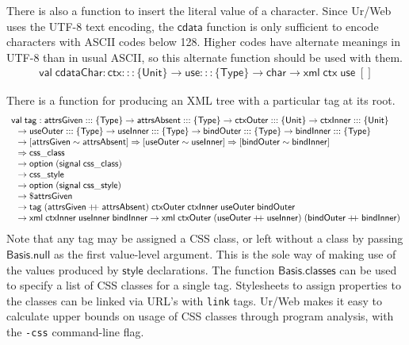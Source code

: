 \documentclass{article}
\newcommand{\cd}[1]{\texttt{#1}}
\newcommand{\mt}[1]{\mathsf{#1}}
\newcommand{\rc}{+ \hspace{-.075in} + \;}
\begin{document}
There is also a function to insert the literal value of a character.  Since Ur/Web uses the UTF-8 text encoding, the $\mt{cdata}$ function is only sufficient to encode characters with ASCII codes below 128.  Higher codes have alternate meanings in UTF-8 than in usual ASCII, so this alternate function should be used with them.
$$\begin{array}{l}
  \mt{val} \; \mt{cdataChar} : \mt{ctx} ::: \{\mt{Unit}\} \to \mt{use} ::: \{\mt{Type}\} \to \mt{char} \to \mt{xml} \; \mt{ctx} \; \mt{use} \; []
\end{array}$$

There is a function for producing an XML tree with a particular tag at its root.
$$\begin{array}{l}
  \mt{val} \; \mt{tag} : \mt{attrsGiven} ::: \{\mt{Type}\} \to \mt{attrsAbsent} ::: \{\mt{Type}\} \to \mt{ctxOuter} ::: \{\mt{Unit}\} \to \mt{ctxInner} ::: \{\mt{Unit}\} \\
  \hspace{.1in} \to \mt{useOuter} ::: \{\mt{Type}\} \to \mt{useInner} ::: \{\mt{Type}\} \to \mt{bindOuter} ::: \{\mt{Type}\} \to \mt{bindInner} ::: \{\mt{Type}\} \\
  \hspace{.1in} \to [\mt{attrsGiven} \sim \mt{attrsAbsent}] \Rightarrow [\mt{useOuter} \sim \mt{useInner}] \Rightarrow [\mt{bindOuter} \sim \mt{bindInner}] \\
  \hspace{.1in} \Rightarrow \mt{css\_class} \\
  \hspace{.1in} \to \mt{option} \; (\mt{signal} \; \mt{css\_class}) \\
  \hspace{.1in} \to \mt{css\_style} \\
  \hspace{.1in} \to \mt{option} \; (\mt{signal} \; \mt{css\_style}) \\
  \hspace{.1in} \to \$\mt{attrsGiven} \\
  \hspace{.1in} \to \mt{tag} \; (\mt{attrsGiven} \rc \mt{attrsAbsent}) \; \mt{ctxOuter} \; \mt{ctxInner} \; \mt{useOuter} \; \mt{bindOuter} \\
  \hspace{.1in} \to \mt{xml} \; \mt{ctxInner} \; \mt{useInner} \; \mt{bindInner} \to \mt{xml} \; \mt{ctxOuter} \; (\mt{useOuter} \rc \mt{useInner}) \; (\mt{bindOuter} \rc \mt{bindInner})
\end{array}$$
Note that any tag may be assigned a CSS class, or left without a class by passing $\mt{Basis.null}$ as the first value-level argument.  This is the sole way of making use of the values produced by $\mt{style}$ declarations.  The function $\mt{Basis.classes}$ can be used to specify a list of CSS classes for a single tag.  Stylesheets to assign properties to the classes can be linked via URL's with \texttt{link} tags.  Ur/Web makes it easy to calculate upper bounds on usage of CSS classes through program analysis, with the \cd{-css} command-line flag.
\end{document}
